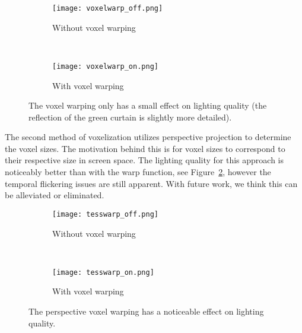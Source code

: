 \begin{figure}[h!]
    \centering
    \begin{subfigure}[t]{0.4\textwidth}
        \texttt{[image: voxelwarp\_off.png]}
        \caption{Without voxel warping}
    \end{subfigure}
    ~
    \begin{subfigure}[t]{0.4\textwidth}
        \texttt{[image: voxelwarp\_on.png]}
        \caption{With voxel warping}
    \end{subfigure}
    \caption{The voxel warping only has a small effect on lighting quality (the reflection of the green curtain is slightly more detailed).}
    \label{fig:results_voxelwarp}
\end{figure}

The second method of voxelization utilizes perspective projection to determine the voxel sizes. The motivation behind this is for voxel sizes to correspond to their respective size in screen space. The lighting quality for this approach is noticeably better than with the warp function, see Figure~\ref{fig:results_tesswarp}, however the temporal flickering issues are still apparent. With future work, we think this can be alleviated or eliminated.

\begin{figure}[h!]
    \centering
    \begin{subfigure}[t]{0.4\textwidth}
        \texttt{[image: tesswarp\_off.png]}
        \caption{Without voxel warping}
    \end{subfigure}
    ~
    \begin{subfigure}[t]{0.4\textwidth}
        \texttt{[image: tesswarp\_on.png]}
        \caption{With voxel warping}
    \end{subfigure}
    \caption{The perspective voxel warping has a noticeable effect on lighting quality.}
    \label{fig:results_tesswarp}
\end{figure}




